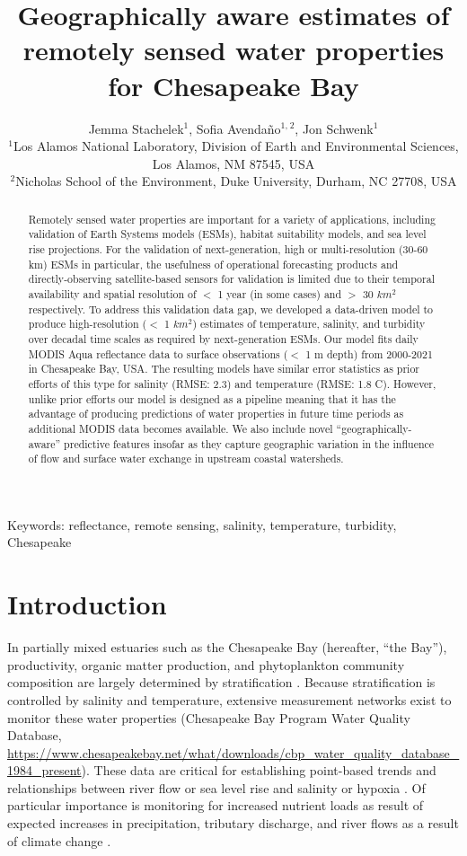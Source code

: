 \documentclass{article}
\title{Geographically aware estimates of remotely sensed water properties for Chesapeake Bay}
\author{Jemma Stachelek$^{1}$, Sofia Avendaño$^{1,}$$^{2}$, Jon Schwenk$^{1}$  \\
        \small $^{1}$Los Alamos National Laboratory, Division of Earth and Environmental Sciences, Los Alamos, NM 87545, USA \\
        \small $^{2}$Nicholas School of the Environment, Duke University, Durham, NC 27708, USA \\
}
\date{}
\begin{document}
\maketitle
\thispagestyle{firstpage}

\begin{abstract}
    \noindent Remotely sensed water properties are important for a variety of applications, including validation of Earth Systems models (ESMs), habitat suitability models, and sea level rise projections. For the validation of next-generation, high or multi-resolution (30-60 km) ESMs in particular, the usefulness of operational forecasting products and directly-observing satellite-based sensors for validation is limited due to their temporal availability and spatial resolution of $<$ 1 year (in some cases) and $>$ 30 $km^2$ respectively. To address this validation data gap, we developed a data-driven model to produce high-resolution ($<$ 1 $km^2$) estimates of temperature, salinity, and turbidity over decadal time scales as required by next-generation ESMs. Our model fits daily MODIS Aqua reflectance data to surface observations ($<$ 1 m depth) from 2000-2021 in Chesapeake Bay, USA. The resulting models have similar error statistics as prior efforts of this type for salinity (RMSE: 2.3) and temperature (RMSE: 1.8 C). However, unlike prior efforts our model is designed as a pipeline meaning that it has the advantage of producing predictions of water properties in future time periods as additional MODIS data becomes available. We also include novel  “geographically-aware” predictive features insofar as they capture geographic variation in the influence of flow and surface water exchange in upstream coastal watersheds.
    \end{abstract} \hspace{10pt}

Keywords: reflectance, remote sensing, salinity, temperature, turbidity, Chesapeake

\linenumbers

\section{Introduction}

In partially mixed estuaries such as the Chesapeake Bay (hereafter, “the Bay”), productivity, organic matter production, and phytoplankton community composition are largely determined by stratification \cite{xuClimateForcingSalinity2012}. Because stratification is controlled by salinity and temperature, extensive measurement networks exist to monitor these water properties (Chesapeake Bay Program Water Quality Database, \url{https://www.chesapeakebay.net/what/downloads/cbp_water_quality_database_1984_present}). These data are critical for establishing point-based trends and relationships between river flow or sea level rise and salinity or hypoxia \cite{hagyHypoxiaChesapeakeBay2004}. Of particular importance is monitoring for increased nutrient loads as result of expected increases in precipitation, tributary discharge, and river flows as a result of climate change \cite{najjarPotentialClimatechangeImpacts2010, irbyCompetingImpactsClimate2018}.
\end{document}
